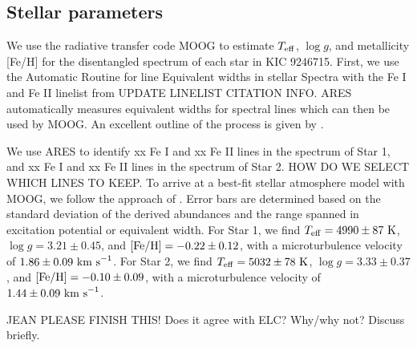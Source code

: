 \subsection{Stellar parameters}\label{parameters}
We use the radiative transfer code MOOG \citep{sne73} to estimate $T_{\rm{eff}}$, $\log g$, and metallicity [Fe/H] for the disentangled spectrum of each star in KIC 9246715. First, we use the Automatic Routine for line Equivalent widths in stellar Spectra \citep[ARES,][]{Sousa_2007} with the Fe I and Fe II linelist from \citet{Yong_2005} UPDATE LINELIST CITATION INFO. ARES automatically measures equivalent widths for spectral lines which can then be used by MOOG. An excellent outline of the process is given by \citet{Sousa_2014}.

We use ARES to identify xx Fe I and xx Fe II lines in the spectrum of Star 1, and xx Fe I and xx Fe II lines in the spectrum of Star 2. HOW DO WE SELECT WHICH LINES TO KEEP. To arrive at a best-fit stellar atmosphere model with MOOG, we follow the approach of \citet{mag13}. Error bars are determined based on the standard deviation of the derived abundances and the range spanned in excitation potential or equivalent width. For Star 1, we find $T_{\rm{eff}} = 4990 \pm87 \ \rm{K}$, $\log g = 3.21 \pm 0.45$, and $\rm{[Fe/H]} = -0.22 \pm 0.12$, with a microturbulence velocity of $1.86 \pm 0.09 \ \rm{km \ s}^{-1}$. For Star 2, we find $T_{\rm{eff}} = 5032 \pm 78 \ \rm{K}$, $\log g = 3.33 \pm 0.37$, and $\rm{[Fe/H]} = -0.10 \pm 0.09$, with a microturbulence velocity of $1.44 \pm 0.09 \ \rm{km \ s}^{-1}$.

JEAN PLEASE FINISH THIS! Does it agree with ELC? Why/why not? Discuss briefly.
    
    
    
    
  